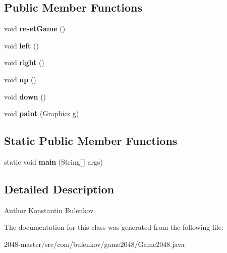 \subsection*{Public Member Functions}
\begin{DoxyCompactItemize}
\item 
\hypertarget{classcom_1_1bulenkov_1_1game2048_1_1_game2048_a6d6f35f0d8bc8f7c794ae32d1d3d0a75}{}void {\bfseries reset\+Game} ()\label{classcom_1_1bulenkov_1_1game2048_1_1_game2048_a6d6f35f0d8bc8f7c794ae32d1d3d0a75}

\item 
\hypertarget{classcom_1_1bulenkov_1_1game2048_1_1_game2048_a5cd88e064d17eadd44a676dc1d27f1c5}{}void {\bfseries left} ()\label{classcom_1_1bulenkov_1_1game2048_1_1_game2048_a5cd88e064d17eadd44a676dc1d27f1c5}

\item 
\hypertarget{classcom_1_1bulenkov_1_1game2048_1_1_game2048_af3f8d3a2c14a4498015feee1d6bfc55b}{}void {\bfseries right} ()\label{classcom_1_1bulenkov_1_1game2048_1_1_game2048_af3f8d3a2c14a4498015feee1d6bfc55b}

\item 
\hypertarget{classcom_1_1bulenkov_1_1game2048_1_1_game2048_aab3725c777a9258dba4d4623fc42668a}{}void {\bfseries up} ()\label{classcom_1_1bulenkov_1_1game2048_1_1_game2048_aab3725c777a9258dba4d4623fc42668a}

\item 
\hypertarget{classcom_1_1bulenkov_1_1game2048_1_1_game2048_aba3585754a10bb682fa3a73b1033f9cb}{}void {\bfseries down} ()\label{classcom_1_1bulenkov_1_1game2048_1_1_game2048_aba3585754a10bb682fa3a73b1033f9cb}

\item 
\hypertarget{classcom_1_1bulenkov_1_1game2048_1_1_game2048_a23c4decbae629c5caf6b7b0f45f46f26}{}void {\bfseries paint} (Graphics g)\label{classcom_1_1bulenkov_1_1game2048_1_1_game2048_a23c4decbae629c5caf6b7b0f45f46f26}

\end{DoxyCompactItemize}
\subsection*{Static Public Member Functions}
\begin{DoxyCompactItemize}
\item 
\hypertarget{classcom_1_1bulenkov_1_1game2048_1_1_game2048_a275a5a0e25aa8838649b6268c03bdb06}{}static void {\bfseries main} (String\mbox{[}$\,$\mbox{]} args)\label{classcom_1_1bulenkov_1_1game2048_1_1_game2048_a275a5a0e25aa8838649b6268c03bdb06}

\end{DoxyCompactItemize}


\subsection{Detailed Description}
\begin{DoxyAuthor}{Author}
Konstantin Bulenkov 
\end{DoxyAuthor}


The documentation for this class was generated from the following file\+:\begin{DoxyCompactItemize}
\item 
2048-\/master/src/com/bulenkov/game2048/Game2048.\+java\end{DoxyCompactItemize}

